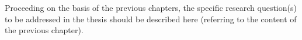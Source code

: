 Proceeding on the basis of the previous chapters, the specific research question(s) to be addressed in the
thesis should be described here (referring to the content of the previous chapter).


